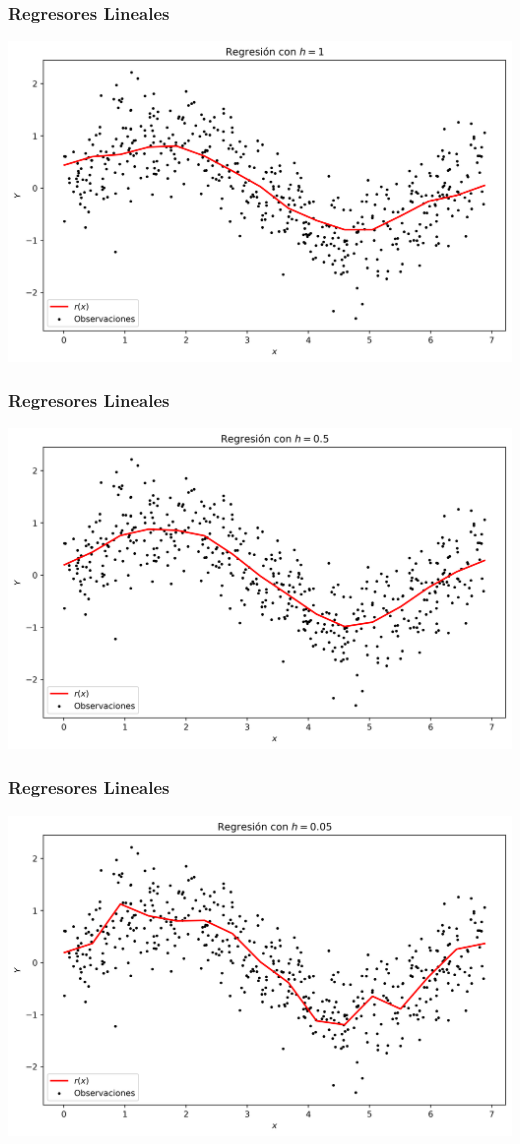 \documentclass[aspectratio=169,spanish]{beamer}
\begin{document}
\begin{frame}
\frametitle{Regresores Lineales}
\center
\includegraphics[scale=0.5]{regresion5}
\end{frame}
\begin{frame}
\frametitle{Regresores Lineales}
\center
\includegraphics[scale=0.5]{regresion6}
\end{frame}
\begin{frame}
\frametitle{Regresores Lineales}
\center
\includegraphics[scale=0.5]{regresion7}
\end{frame}
\end{document}
